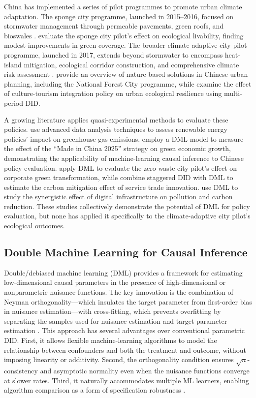China has implemented a series of pilot programmes to promote urban
climate adaptation. The sponge city programme, launched in 2015--2016,
focused on stormwater management through permeable pavements, green
roofs, and bioswales \citep{han2023chinas}. \citet{wang2024sponge}
evaluate the sponge city pilot's effect on ecological livability,
finding modest improvements in green coverage. The broader
climate-adaptive city pilot programme, launched in 2017, extends
beyond stormwater to encompass heat-island mitigation, ecological
corridor construction, and comprehensive climate risk assessment
\citep{ipcc2023cities}. \citet{wang2024urban} provide an overview of
nature-based solutions in Chinese urban planning, including the
National Forest City programme, while \citet{lu2026does} examine the
effect of culture-tourism integration policy on urban ecological
resilience using multi-period DID.

A growing literature applies quasi-experimental methods to evaluate
these policies. \citet{gao2025renewable} use advanced data analysis
techniques to assess renewable energy policies' impact on greenhouse
gas emissions. \citet{yuan2024double} employ a DML model to measure the
effect of the ``Made in China 2025'' strategy on green economic growth,
demonstrating the applicability of machine-learning causal inference
to Chinese policy evaluation. \citet{qian2025impact} apply DML to
evaluate the zero-waste city pilot's effect on corporate green
transformation, while \citet{yu2025carbon} combine staggered DID with
DML to estimate the carbon mitigation effect of service trade
innovation. \citet{zhang2025does} use DML to study the synergistic
effect of digital infrastructure on pollution and carbon reduction.
These studies collectively demonstrate the potential of DML for policy
evaluation, but none has applied it specifically to the climate-adaptive
city pilot's ecological outcomes.

\subsection{Double Machine Learning for Causal Inference}

Double/debiased machine learning (DML) \citep{chernozhukov2022automatic}
provides a framework for estimating low-dimensional causal parameters in
the presence of high-dimensional or nonparametric nuisance functions.
The key innovation is the combination of Neyman orthogonality---which
insulates the target parameter from first-order bias in nuisance
estimation---with cross-fitting, which prevents overfitting by
separating the samples used for nuisance estimation and target
parameter estimation \citep{ahrens2024ddml,bia2023double}. This approach
has several advantages over conventional parametric DID. First, it
allows flexible machine-learning algorithms to model the relationship
between confounders and both the treatment and outcome, without
imposing linearity or additivity. Second, the orthogonality condition
ensures $\sqrt{n}$-consistency and asymptotic normality even when the
nuisance functions converge at slower rates. Third, it naturally
accommodates multiple ML learners, enabling algorithm comparison as a
form of specification robustness \citep{byrnes2025causal}.

